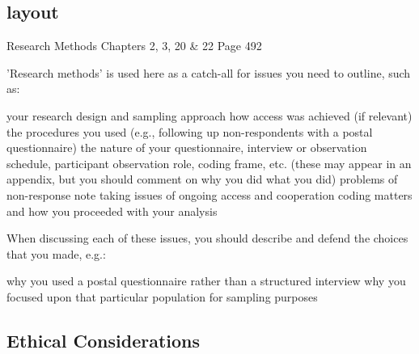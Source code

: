 \subsection{layout}
Research Methods
Chapters 2, 3, 20 \& 22
Page 492

'Research methods' is used here as a catch-all for issues you need to outline, such as:

your research design and sampling approach
how access was achieved (if relevant)
the procedures you used (e.g., following up non-respondents with a postal questionnaire)
the nature of your questionnaire, interview or observation schedule, participant observation role, coding frame, etc. (these may appear in an appendix, but you should comment on why you did what you did)
problems of non-response
note taking
issues of ongoing access and cooperation
coding matters and how you proceeded with your analysis

When discussing each of these issues, you should describe and defend the choices that you made, e.g.:

why you used a postal questionnaire rather than a structured interview
why you focused upon that particular population for sampling purposes

\subsection{Ethical Considerations}